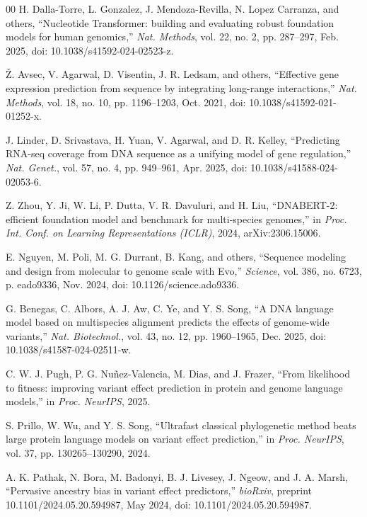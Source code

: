 \documentclass[10pt,journal]{IEEEtran}
\begin{document}
\begin{thebibliography}{00}
 H. Dalla-Torre, L. Gonzalez, J. Mendoza-Revilla, N. Lopez Carranza, and others, ``Nucleotide Transformer: building and evaluating robust foundation models for human genomics,'' \textit{Nat. Methods}, vol. 22, no. 2, pp. 287--297, Feb. 2025, doi: 10.1038/s41592-024-02523-z.

 \v{Z}. Avsec, V. Agarwal, D. Visentin, J. R. Ledsam, and others, ``Effective gene expression prediction from sequence by integrating long-range interactions,'' \textit{Nat. Methods}, vol. 18, no. 10, pp. 1196--1203, Oct. 2021, doi: 10.1038/s41592-021-01252-x.

 J. Linder, D. Srivastava, H. Yuan, V. Agarwal, and D. R. Kelley, ``Predicting RNA-seq coverage from DNA sequence as a unifying model of gene regulation,'' \textit{Nat. Genet.}, vol. 57, no. 4, pp. 949--961, Apr. 2025, doi: 10.1038/s41588-024-02053-6.

 Z. Zhou, Y. Ji, W. Li, P. Dutta, V. R. Davuluri, and H. Liu, ``DNABERT-2: efficient foundation model and benchmark for multi-species genomes,'' in \textit{Proc. Int. Conf. on Learning Representations (ICLR)}, 2024, arXiv:2306.15006.

 E. Nguyen, M. Poli, M. G. Durrant, B. Kang, and others, ``Sequence modeling and design from molecular to genome scale with Evo,'' \textit{Science}, vol. 386, no. 6723, p. eado9336, Nov. 2024, doi: 10.1126/science.ado9336.

 G. Benegas, C. Albors, A. J. Aw, C. Ye, and Y. S. Song, ``A DNA language model based on multispecies alignment predicts the effects of genome-wide variants,'' \textit{Nat. Biotechnol.}, vol. 43, no. 12, pp. 1960--1965, Dec. 2025, doi: 10.1038/s41587-024-02511-w.

 C. W. J. Pugh, P. G. Nu\~nez-Valencia, M. Dias, and J. Frazer, ``From likelihood to fitness: improving variant effect prediction in protein and genome language models,'' in \textit{Proc. NeurIPS}, 2025.

 S. Prillo, W. Wu, and Y. S. Song, ``Ultrafast classical phylogenetic method beats large protein language models on variant effect prediction,'' in \textit{Proc. NeurIPS}, vol. 37, pp. 130265--130290, 2024.

 A. K. Pathak, N. Bora, M. Badonyi, B. J. Livesey, J. Ngeow, and J. A. Marsh, ``Pervasive ancestry bias in variant effect predictors,'' \textit{bioRxiv}, preprint 10.1101/2024.05.20.594987, May 2024, doi: 10.1101/2024.05.20.594987.


\end{thebibliography}
\end{document}
